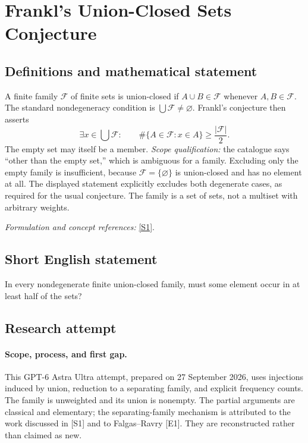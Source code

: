 \documentclass[11pt]{article}
\begin{document}
\section*{\texorpdfstring{Frankl's Union-Closed Sets Conjecture}{Frankl's Union-Closed Sets Conjecture}}\label{55}
\subsection{Definitions and mathematical statement}
A finite family $\mathcal F$ of finite sets is union-closed if $A\cup B\in\mathcal F$ whenever $A,B\in\mathcal F$. The standard nondegeneracy condition is $\bigcup\mathcal F\ne\varnothing$. Frankl's conjecture then asserts
\[
 \exists x\in\bigcup\mathcal F:\qquad
 \#\{A\in\mathcal F:x\in A\}\ge\frac{|\mathcal F|}{2}.
\]
The empty set may itself be a member. \emph{Scope qualification:} the catalogue says ``other than the empty set,'' which is ambiguous for a family. Excluding only the empty family is insufficient, because $\mathcal F=\{\varnothing\}$ is union-closed and has no element at all. The displayed statement explicitly excludes both degenerate cases, as required for the usual conjecture. The family is a set of sets, not a multiset with arbitrary weights.
\par\smallskip\textit{Formulation and concept references:} \href{https://arxiv.org/pdf/1309.3297}{[S1]}.

\subsection{Short English statement}
In every nondegenerate finite union-closed family, must some element occur in at least half of the sets?
\subsection{Research attempt}
\paragraph{Scope, process, and first gap.}
This GPT-6 Astra Ultra attempt, prepared on 27 September 2026, uses injections induced by union, reduction to a separating family, and explicit frequency counts. The family is unweighted and its union is nonempty. The partial arguments are classical and elementary; the separating-family mechanism is attributed to the work discussed in [S1] and to Falgas--Ravry [E1]. They are reconstructed rather than claimed as new.
\end{document}
